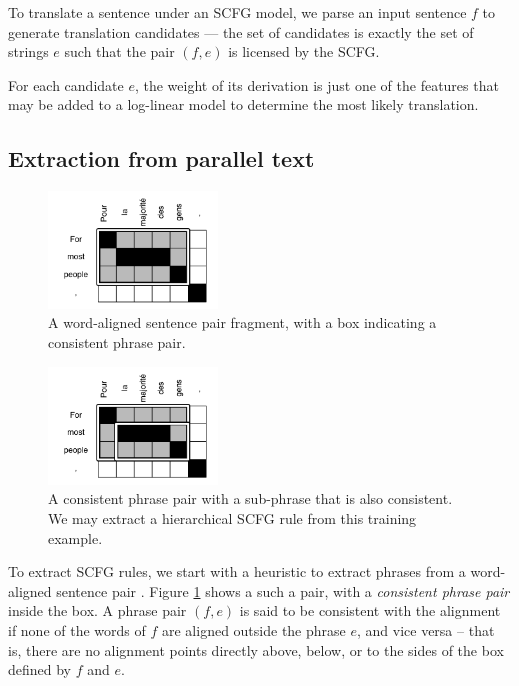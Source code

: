 \documentclass{article}
\begin{document}
To translate a sentence under an SCFG model, we parse an input sentence $f$ to generate translation candidates --- the set of candidates is exactly the set of strings $e$ such that the pair $(f,e)$ is licensed by the SCFG.

For each candidate $e$, the weight of its derivation is just one of the features that may be added to a log-linear model to determine the most likely translation.

\subsection{Extraction from parallel text}

\begin{figure}[t]
\includegraphics[width=0.4\textwidth]{figures/simple-rule}
\caption{A word-aligned sentence pair fragment, with a box indicating a consistent phrase pair.\label{fig:aligned-sentence}}
\end{figure}

\begin{figure}[t]
\includegraphics[width=0.4\textwidth]{figures/hierarchical-rule}
\caption{A consistent phrase pair with a sub-phrase that is also consistent. We may extract a hierarchical SCFG rule from this training example.\label{fig:hierarchical-phrases}}
\end{figure}

To extract SCFG rules, we start with a heuristic to extract phrases from a word-aligned sentence pair \cite{tillmann-2003}. Figure \ref{fig:aligned-sentence} shows a such a pair, with a {\em consistent phrase pair} inside the box. A phrase pair $(f,e)$ is said to be consistent with the alignment if none of the words of $f$ are aligned outside the phrase $e$, and vice versa -- that is, there are no alignment points directly above, below, or to the sides of the box defined by $f$ and $e$.
\end{document}
